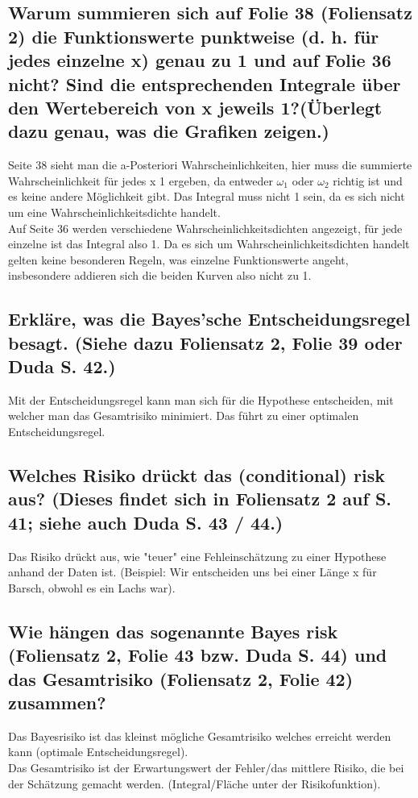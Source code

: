 \documentclass{scrartcl}
\begin{document}
\subsection{Warum summieren sich auf Folie 38 (Foliensatz 2) die Funktionswerte punktweise (d. h. für jedes einzelne x) genau zu 1 und auf Folie 36 nicht? Sind die entsprechenden Integrale über den Wertebereich von x jeweils 1?(Überlegt dazu genau, was die Grafiken zeigen.)}

Seite 38 sieht man die a-Posteriori Wahrscheinlichkeiten, hier muss die summierte Wahrscheinlichkeit für jedes x 1 ergeben, da entweder $\omega_1$ oder $\omega_2$ richtig ist und es keine andere Möglichkeit gibt. Das Integral muss nicht 1 sein, da es sich nicht um eine Wahrscheinlichkeitsdichte handelt.\\
Auf Seite 36 werden verschiedene Wahrscheinlichkeitsdichten angezeigt, für jede einzelne ist das Integral also 1. Da es sich um Wahrscheinlichkeitsdichten handelt gelten keine besonderen Regeln, was einzelne Funktionswerte angeht, insbesondere addieren sich die beiden Kurven also nicht zu 1.

\subsection{Erkläre, was die Bayes’sche Entscheidungsregel besagt. (Siehe dazu Foliensatz 2, Folie 39 oder Duda S. 42.)}
Mit der Entscheidungsregel kann man sich für die Hypothese entscheiden, mit welcher man das Gesamtrisiko minimiert. Das führt zu einer optimalen Entscheidungsregel. 

\subsection{Welches Risiko drückt das (conditional) risk aus? (Dieses findet sich in Foliensatz 2 auf S. 41; siehe auch Duda S. 43 / 44.)}
Das Risiko drückt aus, wie "teuer" eine Fehleinschätzung zu einer Hypothese anhand der Daten ist. (Beispiel: Wir entscheiden uns bei einer Länge x für Barsch, obwohl es ein Lachs war). 


\subsection{Wie hängen das sogenannte Bayes risk (Foliensatz 2, Folie 43 bzw. Duda S. 44) und das Gesamtrisiko (Foliensatz 2, Folie 42) zusammen?}
Das Bayesrisiko ist das kleinst mögliche Gesamtrisiko welches erreicht werden kann (optimale Entscheidungsregel). \\
Das Gesamtrisiko ist der Erwartungswert der Fehler/das mittlere Risiko, die bei der Schätzung gemacht werden. (Integral/Fläche unter der Risikofunktion).
\end{document}
